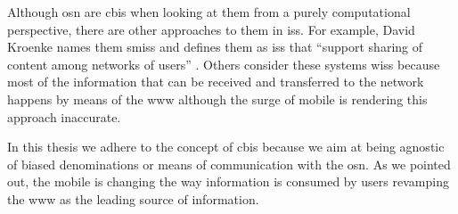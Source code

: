 Although \ac{osn} are \ac{cbis} when looking at them from a purely computational 
perspective, there are other approaches to them in \acp{is}. For example, David 
Kroenke names them \acp{smis} and defines them as \acp{is} that ``support sharing 
of content among networks of users'' \cite{Kroenke15}. Others consider these systems 
\acp{wis} because most of the information that can be received and transferred to 
the network happens by means of the \ac{www} although the surge of mobile \Internet 
is rendering this approach inaccurate.

In this thesis we adhere to the concept of \ac{cbis} because we aim at being agnostic 
of biased denominations or means of communication with the \ac{osn}. As we pointed 
out, the mobile \Internet is changing the way information is consumed by users revamping 
the \ac{www} as the leading source of information.




%
%


